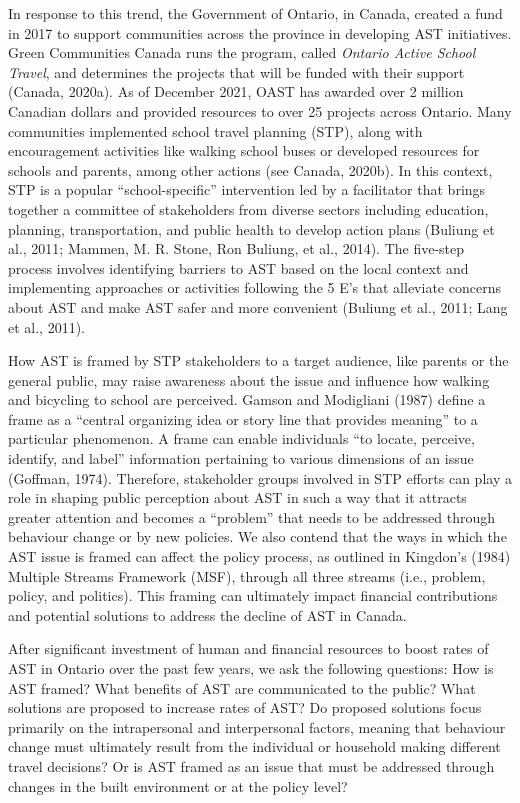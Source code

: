 \documentclass[]{elsarticle} %
\begin{document}
In response to this trend, the Government of Ontario, in Canada, created
a fund in 2017 to support communities across the province in developing
AST initiatives. Green Communities Canada runs the program, called
\emph{Ontario Active School Travel}, and determines the projects that
will be funded with their support (Canada, 2020a). As of December 2021,
OAST has awarded over 2 million Canadian dollars and provided resources
to over 25 projects across Ontario. Many communities implemented school
travel planning (STP), along with encouragement activities like walking
school buses or developed resources for schools and parents, among other
actions (see Canada, 2020b). In this context, STP is a popular
``school-specific'' intervention led by a facilitator that brings
together a committee of stakeholders from diverse sectors including
education, planning, transportation, and public health to develop action
plans (Buliung et al., 2011; Mammen, M. R. Stone, Ron Buliung, et al.,
2014). The five-step process involves identifying barriers to AST based
on the local context and implementing approaches or activities following
the 5 E's that alleviate concerns about AST and make AST safer and more
convenient (Buliung et al., 2011; Lang et al., 2011).

How AST is framed by STP stakeholders to a target audience, like parents
or the general public, may raise awareness about the issue and influence
how walking and bicycling to school are perceived. Gamson and Modigliani
(1987) define a frame as a ``central organizing idea or story line that
provides meaning'' to a particular phenomenon. A frame can enable
individuals ``to locate, perceive, identify, and label'' information
pertaining to various dimensions of an issue (Goffman, 1974). Therefore,
stakeholder groups involved in STP efforts can play a role in shaping
public perception about AST in such a way that it attracts greater
attention and becomes a ``problem'' that needs to be addressed through
behaviour change or by new policies. We also contend that the ways in
which the AST issue is framed can affect the policy process, as outlined
in Kingdon's (1984) Multiple Streams Framework (MSF), through all three
streams (i.e., problem, policy, and politics). This framing can
ultimately impact financial contributions and potential solutions to
address the decline of AST in Canada.

After significant investment of human and financial resources to boost
rates of AST in Ontario over the past few years, we ask the following
questions: How is AST framed? What benefits of AST are communicated to
the public? What solutions are proposed to increase rates of AST? Do
proposed solutions focus primarily on the intrapersonal and
interpersonal factors, meaning that behaviour change must ultimately
result from the individual or household making different travel
decisions? Or is AST framed as an issue that must be addressed through
changes in the built environment or at the policy level?
\end{document}

